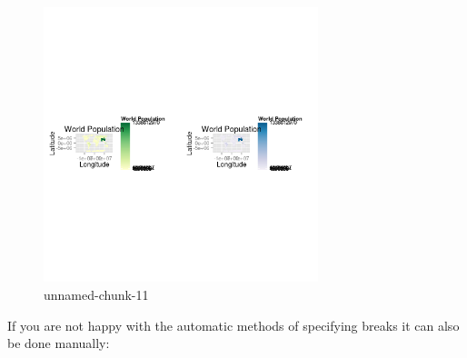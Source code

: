 \documentclass[]{article}
\let\Oldincludegraphics\includegraphics
\renewcommand{\includegraphics}[1]{\Oldincludegraphics[width=8cm]{#1}}
\begin{document}
\begin{figure}[htbp]
\centering
\includegraphics{figure/unnamed-chunk-11.png}
\caption{unnamed-chunk-11}
\end{figure}

If you are not happy with the automatic methods of specifying breaks it
can also be done manually:
\end{document}

